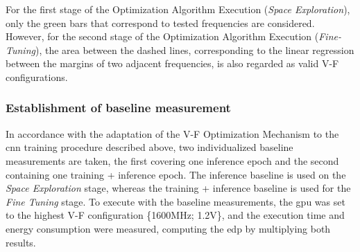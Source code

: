 For the first stage of the Optimization Algorithm Execution (\textit{Space Exploration}), only the green bars that correspond to tested frequencies are considered. However, for the second stage of the Optimization Algorithm Execution (\textit{Fine-Tuning}), the area between the dashed lines, corresponding to the linear regression between the margins of two adjacent frequencies, is also regarded as valid V-F configurations.

\subsubsection{Establishment of baseline measurement}

In accordance with the adaptation of the V-F Optimization Mechanism to the \acrshort{cnn} training procedure described above, two individualized baseline measurements are taken, the first covering one inference epoch and the second containing one training + inference epoch. The inference baseline is used on the \textit{Space Exploration} stage, whereas the training + inference baseline is used for the \textit{Fine Tuning} stage. To execute with the baseline measurements, the \acrshort{gpu} was set to the highest V-F configuration \{1600MHz; 1.2V\}, and the execution time and energy consumption were measured, computing the \acrshort{edp} by multiplying both results.








